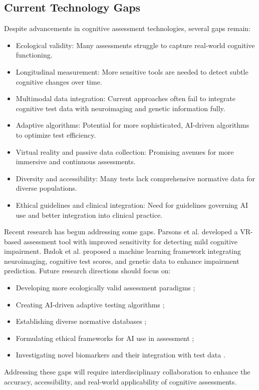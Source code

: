 \subsection{Current Technology Gaps}
Despite advancements in cognitive assessment technologies, several gaps remain:
\begin{itemize}
\item Ecological validity: Many assessments struggle to capture real-world cognitive functioning.
\item Longitudinal measurement: More sensitive tools are needed to detect subtle cognitive changes over time.
\item Multimodal data integration: Current approaches often fail to integrate cognitive test data with neuroimaging and genetic information fully.
\item Adaptive algorithms: Potential for more sophisticated, AI-driven algorithms to optimize test efficiency.
\item Virtual reality and passive data collection: Promising avenues for more immersive and continuous assessments.
\item Diversity and accessibility: Many tests lack comprehensive normative data for diverse populations.
\item Ethical guidelines and clinical integration: Need for guidelines governing AI use and better integration into clinical practice.
\end{itemize}
Recent research has begun addressing some gaps. Parsons et al. \cite{Parsons2021} developed a VR-based assessment tool with improved sensitivity for detecting mild cognitive impairment. Bzdok et al. \cite{Bzdok2020} proposed a machine learning framework integrating neuroimaging, cognitive test scores, and genetic data to enhance impairment prediction.
Future research directions should focus on:
\begin{itemize}
\item Developing more ecologically valid assessment paradigms \cite{Parsons2021};
\item Creating AI-driven adaptive testing algorithms \cite{Zorluoglu2020};
\item Establishing diverse normative databases \cite{Gianfrancesco2018};
\item Formulating ethical frameworks for AI use in assessment \cite{Birhane2021};
\item Investigating novel biomarkers and their integration with test data \cite{Bzdok2020}.
\end{itemize}
Addressing these gaps will require interdisciplinary collaboration to enhance the accuracy, accessibility, and real-world applicability of cognitive assessments.

